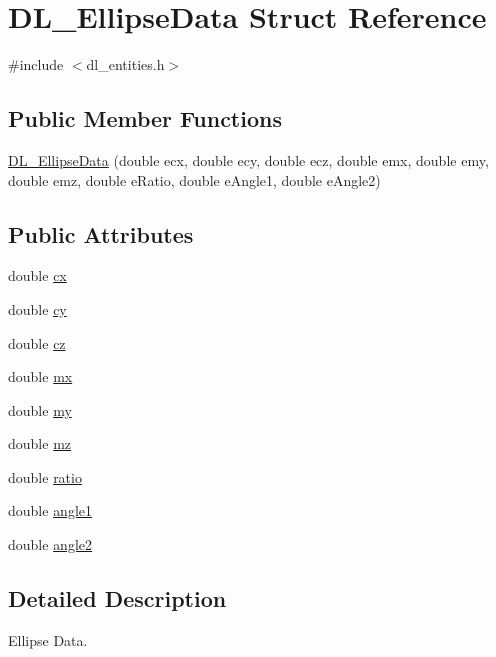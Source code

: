 \hypertarget{structDL__EllipseData}{\section{D\-L\-\_\-\-Ellipse\-Data Struct Reference}
\label{structDL__EllipseData}
}


{\ttfamily \#include $<$dl\-\_\-entities.\-h$>$}

\subsection*{Public Member Functions}
\begin{DoxyCompactItemize}
\item 
\hyperlink{structDL__EllipseData_af6391b56f149bb4cf099d87ec78c35f1}{D\-L\-\_\-\-Ellipse\-Data} (double ecx, double ecy, double ecz, double emx, double emy, double emz, double e\-Ratio, double e\-Angle1, double e\-Angle2)
\end{DoxyCompactItemize}
\subsection*{Public Attributes}
\begin{DoxyCompactItemize}
\item 
double \hyperlink{structDL__EllipseData_a284a7366884274a17706c49be09f8a46}{cx}
\item 
double \hyperlink{structDL__EllipseData_aadb924e5422dd6b32ab4ab4077c8b118}{cy}
\item 
double \hyperlink{structDL__EllipseData_ae3208ae1257d71f2475132509a3fb253}{cz}
\item 
double \hyperlink{structDL__EllipseData_affb164bd9bb3b2a6f6e82d4721e0d9d0}{mx}
\item 
double \hyperlink{structDL__EllipseData_a3a613784af502ed5ceff4826512728b8}{my}
\item 
double \hyperlink{structDL__EllipseData_aa16a9677a0a87d1eb32f783aa50fa2f0}{mz}
\item 
double \hyperlink{structDL__EllipseData_a1743665331947c24bab27b38ace677fc}{ratio}
\item 
double \hyperlink{structDL__EllipseData_a3684abdf6b8bf47116e16005df64f0a0}{angle1}
\item 
double \hyperlink{structDL__EllipseData_aeb8df00561139f72101017650477ed0d}{angle2}
\end{DoxyCompactItemize}


\subsection{Detailed Description}
Ellipse Data.

